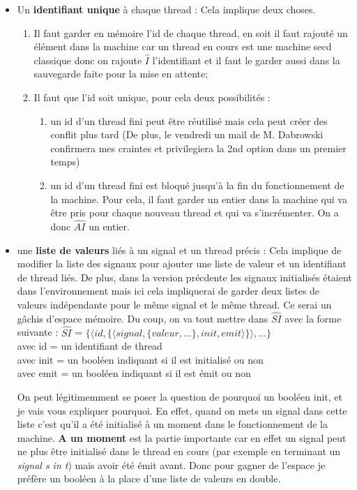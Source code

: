 \documentclass[10pt,a4paper]{article}
\begin{document}
			\begin{itemize}
				\item Un \textbf{identifiant unique} à chaque thread : Cela implique deux choses. 
					\begin{enumerate}
						\item Il faut garder en mémoire l'id de chaque thread, en soit il faut rajouté un élément dans la machine car un thread en cours est une machine secd classique donc on rajoute $\widehat{I}$ l'identifiant et il faut le garder aussi dans la sauvegarde faite pour la mise en attente;
						\item Il faut que l'id soit unique, pour cela deux possibilités : 
							\begin{enumerate}
								\item un id d'un thread fini peut être réutilisé mais cela peut créer des conflit plus tard (De plus, le vendredi un mail de M. Dabrowski confirmera mes craintes et privilegiera la 2nd option dans un premier temps)
								\item un id d'un thread fini est bloqué jusqu'à la fin du fonctionnement de la machine. Pour cela, il faut garder un entier dans la machine qui va être pris pour chaque nouveau thread et qui va s'incrémenter. On a donc $\widehat{AI}$ un entier. 
							\end{enumerate}
					\end{enumerate}
				\item une \textbf{liste de valeurs} liés à un signal et un thread précis : Cela implique de modifier la liste des signaux pour ajouter une liste de valeur et un identifiant de thread liés.
				\smallbreak
				De plus, dans la version précdente les signaux initialisés étaient dans l'environnement mais ici cela impliquerai de garder deux listes de valeurs indépendante pour le même signal et le même thread. Ce serai un gâchis d'espace mémoire. Du coup, on va tout mettre dans $\widehat{SI}$ avec la forme suivante : \smallbreak
				 $\widehat{SI}$  = $\{ \langle id , \{\langle signal , \{valeur,...\},init,emit\rangle\}\rangle,...\}$ 
				 \\ avec id = un identifiant de thread
				 \\ avec init = un booléen indiquant si il est initialisé ou non
				 \\ avec emit = un booléen indiquant si il est émit ou non
				 \medbreak
				 
				 On peut légitimemment se poser la question de pourquoi un booléen init, et je vais vous expliquer pourquoi.
				 \smallbreak
				 En effet, quand on mets un signal dans cette liste c'est qu'il a été initialisé à un moment dans le fonctionnement de la machine. \textbf{A un moment} est la partie importante car en effet un signal peut ne plus être initialisé dans le thread en cours (par exemple en terminant un \textit{signal s in t}) mais avoir été émit avant. Donc pour gagner de l'espace je préfère un booléen à la place d'une liste de valeurs en double.
				 

\end{itemize}
\end{document}
